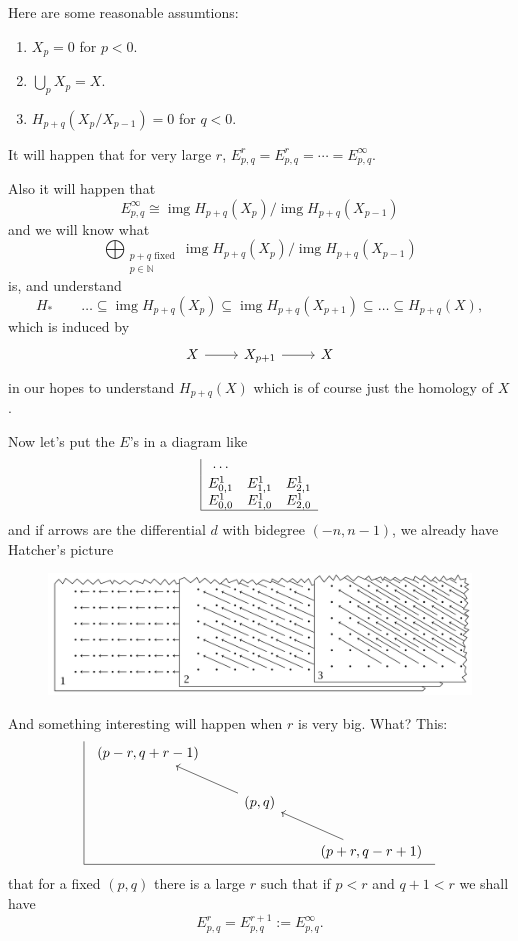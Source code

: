\documentclass{article}
\newcommand{\N}{\mathbb{N}}
\DeclareMathOperator{\img}{img}
\begin{document}
Here are some reasonable assumtions:
\begin{enumerate}
	\item $X_p=0$ for $p<0$.
	\item $\bigcup_p X_p=X$.
	\item $H_{p+q}(X_p/X_{p-1})=0$ for $q<0$.
\end{enumerate}
\begin{remark}
	It will happen that for very large $r$, $E^r_{p,q}=E^r_{p,q}=\cdots=E^\infty_{p,q}$.
	
	Also it will happen that
	\[E^\infty_{p,q}\cong \img H_{p+q}(X_p)/\img H_{p+q}(X_{p-1})\]
	and we will know what
	\[\bigoplus_{\substack{p+q\text{ fixed}\\p\in\N}}\img H_{p+q}(X_p)/\img H_{p+q}(X_{p-1})\]
	is, and understand
	\[H_*\qquad \ldots\subseteq \img H_{p+q}(X_p)\subseteq \img H_{p+q}(X_{p+1})\subseteq \ldots\subseteq H_{p+q}(X),\]
	which is induced by
	\[\begin{tikzcd}
		X\arrow[r]&X_{p+1}\arrow[r]&X
	\end{tikzcd}\]
	in {\color{azure}our hopes to understand $H_{p+q}(X)$ which is of course just the homology of $X$}.
\end{remark}
Now let's put the $E$'s in a diagram like
\begin{align*}
\begin{array}{|ccc}
	\cdots&&\\
	E^1_{0,1}&E^1_{1,1}&E^1_{2,1}\\
	E^1_{0,0}&E^1_{1,0}&E^1_{2,0}\\
	\hline
\end{array}
\end{align*}
and if arrows are the differential $d$ with bidegree $(-n,n-1)$, we already have Hatcher's picture
\begin{figure}[H]
	\centering
	\includegraphics[width=1\linewidth]{spectral}
	\label{fig:spectral}
\end{figure}
And something interesting will happen when $r$ is very big. {\color{magenta}What?}
This:
\[\begin{array}{|c}
	\begin{tikzcd}[column sep=small,row sep=small]
	(p-r,q+r-1)&&&&\\\\
	&&(p,q)\arrow[uull]&&\\\\
	&&&&(p+r,q-r+1)\arrow[uull]
\end{tikzcd}\\
\hline
\end{array}\]
that for a fixed $(p,q)$ there is a large $r$ such that if $p<r$ and $q+1<r$ we shall have
\[E^r_{p,q}=E^{r+1}_{p,q}:=E^\infty_{p,q}.\]
\end{document}
